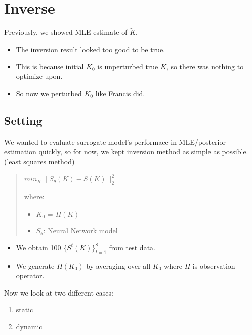 \documentclass[
]{article}
\providecommand{\tightlist}{%
  \setlength{\itemsep}{0pt}\setlength{\parskip}{0pt}}\usepackage{longtable,booktabs,array}
\begin{document}
\section{Inverse}\label{inverse}

Previously, we showed MLE estimate of \(\tilde K\).

\begin{itemize}
\tightlist
\item
  The inversion result looked too good to be true.
\item
  This is because initial \(K_0\) is unperturbed true \(K\), so there
  was nothing to optimize upon.
\item
  So now we perturbed \(K_0\) like Francis did.
\end{itemize}

\subsection{Setting}\label{setting}

We wanted to evaluate surrogate model's performace in MLE/posterior
estimation quickly, so for now, we kept inversion method as simple as
possible. (least squares method)

\begin{quote}
\(min_{K} \|S_{\theta}(K) - S(K)\|_2^2\)

where:

\begin{itemize}
\tightlist
\item
  \(K_0\) = \(H(K)\)
\item
  \(S_{\theta}\): Neural Network model
\end{itemize}
\end{quote}

\hfill\break

\begin{itemize}
\tightlist
\item
  We obtain 100 \(\{S^t(K)\}_{t=1}^8\) from test data.
\item
  We generate \(H(K_0)\) by averaging over all \(K_0\) where \(H\) is
  observation operator.
\end{itemize}

Now we look at two different cases:

\begin{enumerate}
\def\labelenumi{\arabic{enumi}.}
\tightlist
\item
  static
\item
  dynamic
\end{enumerate}
\end{document}
